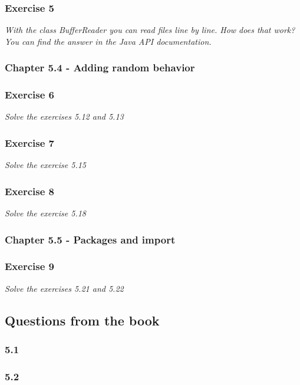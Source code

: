 \subsubsection*{Exercise 5}
\textit{With the class BufferReader you can read files line by line.
How does that work? You can find the answer in the Java API documentation.}

\subsubsection{Chapter 5.4 - Adding random behavior}

\subsubsection*{Exercise 6}
\textit{Solve the exercises 5.12 and 5.13}

\subsubsection*{Exercise 7}
\textit{Solve the exercise 5.15}

\subsubsection*{Exercise 8}
\textit{Solve the exercise 5.18}

\subsubsection{Chapter 5.5 - Packages and import}

\subsubsection*{Exercise 9}
\textit{Solve the exercises 5.21 and 5.22}

\subsection{Questions from the book}

\subsubsection{5.1}

\subsubsection{5.2}

